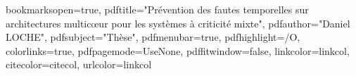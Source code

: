 \def\UrlBigBreaks{\do\/\do-\do:}
\usepackage{url}

\usepackage{ifpdf}

\ifpdf
\usepackage[pdftex]{graphicx}
\usepackage[pagebackref,hyperindex=true]{hyperref} %
\usepackage{tikz}
\usetikzlibrary{arrows,shapes,calc}
\else
\usepackage{graphicx}
\usepackage[a4paper,dvipdfm,pagebackref,hyperindex=true]{hyperref}
\fi


\usepackage[nottoc, notlof, notlot]{tocbibind}
\usepackage[nohints]{minitoc}
\setcounter{minitocdepth}{2}
\mtcindent=15pt
\let\minitocORIG\minitoc
\renewcommand{\minitoc}{\minitocORIG \vspace{1.5em}}

\hypersetup
{
	bookmarksopen=true,
	pdftitle="Prévention des fautes temporelles sur architectures multicœur pour les systèmes à criticité mixte",
	pdfauthor="Daniel LOCHE", %
	pdfsubject="Thèse", %
	pdfmenubar=true, %
	pdfhighlight=/O, %
	colorlinks=true, %
	pdfpagemode=UseNone, %
	pdffitwindow=false, %
	linkcolor=linkcol, %
	citecolor=citecol, %
	urlcolor=linkcol %
}
